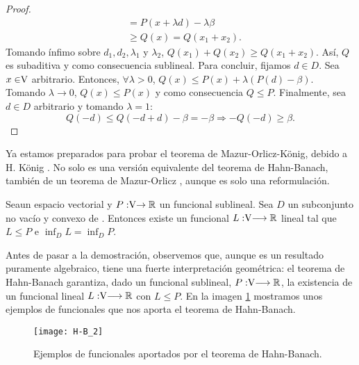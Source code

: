 \begin{proof}
\begin{equation*}
\begin{split}
		& = P(x +\lambda d) - \lambda \beta\\ 
		& \geq Q(x) = Q(x_1 + x_2).
		\end{split}
		\end{equation*}
		Tomando ínfimo sobre $ d_1, d_2, \lambda_1 $ y $ \lambda_2 $, $  Q(x_1) + Q (x_2 ) \geq Q (x_1 + x_2 ) $. Así, $ Q $ es subaditiva y como consecuencia sublineal. Para concluir, fijamos $ d \in D $. Sea $ x \in \vecSpace $ arbitrario. Entonces, $ \forall \lambda > 0 $, $ Q(x) \leq P(x) + \lambda (P(d) - \beta )$. Tomando $ \lambda \longrightarrow 0 $, $ Q(x) \leq P(x)$ y como consecuencia $ Q \leq P $. Finalmente, sea $ d \in D $ arbitrario y tomando $ \lambda = 1 $:
		\[Q(-d) \leq Q(-d+d) - \beta = -\beta \Longrightarrow  -Q(-d) \geq \beta.  \]
		
	\end{proof}
\bigskip

Ya estamos preparados para probar el teorema de Mazur-Orlicz-König, debido a H. König \cite{König1, König2}. No solo es una versión equivalente del teorema de Hahn-Banach, también de un teorema de Mazur-Orlicz \cite{mo}, aunque es solo una reformulación. 

\bigskip
	
	\begin{teoremaBox}\label{M-O}
		Sea\vecSpace un espacio vectorial y $P:\vecSpace \rightarrow \RR$ un funcional sublineal.  Sea $ D $ un subconjunto no vacío y convexo de \vecSpace. Entonces existe un funcional $ L: \vecSpace \longrightarrow \RR $ lineal tal que $ L \leq P $ e $ \inf_D L = \inf_D P $.
	\end{teoremaBox}

Antes de pasar a la demostración, observemos que, aunque es un resultado puramente algebraico, tiene una fuerte interpretación geométrica: el teorema de Hahn-Banach garantiza, dado un funcional sublineal, $ P: \vecSpace \longrightarrow \RR $, la existencia de un funcional lineal $ L:\vecSpace \longrightarrow \RR $ con $ L \leq P $. En la imagen \ref{H-B-varios} mostramos unos ejemplos de funcionales que nos aporta el teorema de Hahn-Banach. \\

\begin{figure}[h!]
	\centering
	\texttt{[image: H-B\_2]}
	\caption{Ejemplos de funcionales aportados por el teorema de Hahn-Banach.}
	\label{H-B-varios}
\end{figure} 

